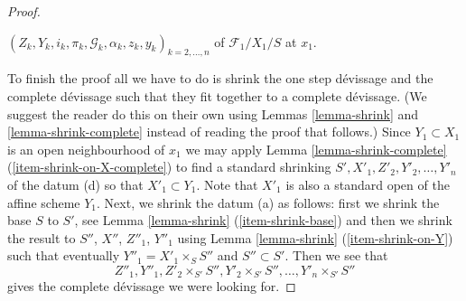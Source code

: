 \begin{proof}
\begin{enumerate}
$(Z_k, Y_k, i_k, \pi_k, \mathcal{G}_k, \alpha_k, z_k, y_k)_{k = 2, \ldots, n}$
of $\mathcal{F}_1/X_1/S$ at $x_1$.
\end{enumerate}
To finish the proof all we have to do is shrink the one step d\'evissage
and the complete d\'evissage such that they fit together to a complete
d\'evissage. (We suggest the reader do this on their own using
Lemmas \ref{lemma-shrink} and
\ref{lemma-shrink-complete}
instead of reading the proof that follows.) Since $Y_1 \subset X_1$
is an open neighbourhood of $x_1$ we may apply
Lemma \ref{lemma-shrink-complete} (\ref{item-shrink-on-X-complete})
to find a standard shrinking $S', X'_1, Z'_2, Y'_2, \ldots, Y'_n$
of the datum (d) so that $X'_1 \subset Y_1$. Note that $X'_1$ is also
a standard open of the affine scheme $Y_1$. Next, we shrink the datum
(a) as follows: first we shrink the base $S$ to $S'$, see
Lemma \ref{lemma-shrink} (\ref{item-shrink-base}) and then
we shrink the result to $S''$, $X''$, $Z''_1$, $Y''_1$ using
Lemma \ref{lemma-shrink} (\ref{item-shrink-on-Y})
such that eventually $Y''_1 = X'_1 \times_S S''$ and $S'' \subset S'$.
Then we see that
$$
Z''_1, Y''_1, Z'_2 \times_{S'} S'', Y'_2 \times_{S'} S'', \ldots,
Y'_n \times_{S'} S''
$$
gives the complete d\'evissage we were looking for.
\end{proof}
